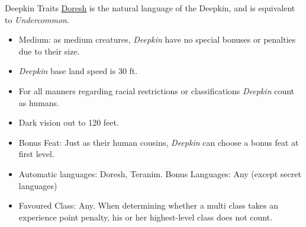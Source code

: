 \begin{35e}{Deepkin Traits}
  \hyperref[sec:Speak Language]{Doresh} is the natural language of the
  Deepkin, and is equivalent to \emph{Undercommon}.

  \begin{itemize}[noitemsep]
    \item Medium: as medium creatures, \emph{Deepkin} have no special bonuses or
    penalties due to their size.
    \item \emph{Deepkin} base land speed is 30 ft.
    \item For all manners regarding racial restrictions or classifications
    \emph{Deepkin} count as humans.
    \item Dark vision out to 120 feet.
    \item Bonus Feat: Just as their human cousins, \emph{Deepkin} can choose a
    bonus feat at first level.
    \item Automatic languages: Doresh, Teranim. Bonus Languages: Any (except
      secret languages)
    \item Favoured Class: Any. When determining whether a multi class takes an
    experience point penalty, his or her highest-level class does not count.
  \end{itemize}
\end{35e}
